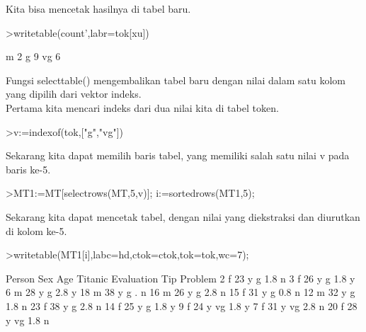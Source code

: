 \documentclass[a4paper,10pt]{article}
\begin{document}
\begin{eulernotebook}
\begin{eulercomment}
\begin{eulercomment}
\begin{eulercomment}
\begin{eulercomment}
\begin{eulercomment}
\begin{eulercomment}
\begin{eulercomment}
\begin{eulercomment}
\begin{eulercomment}
\begin{eulercomment}
\begin{eulercomment}
\begin{eulercomment}
\begin{eulercomment}
\begin{eulercomment}
\begin{eulercomment}
\begin{eulercomment}
\begin{eulercomment}
Kita bisa mencetak hasilnya di tabel baru.
\end{eulercomment}
\begin{eulerprompt}
>writetable(count',labr=tok[xu])
\end{eulerprompt}
\begin{euleroutput}
           m         2
           g         9
          vg         6
\end{euleroutput}
\begin{eulercomment}
Fungsi selecttable() mengembalikan tabel baru dengan nilai dalam satu
kolom yang dipilih dari vektor indeks.\\
Pertama kita mencari indeks dari dua nilai kita di tabel token.
\end{eulercomment}
\begin{eulerprompt}
>v:=indexof(tok,["g","vg"])
\end{eulerprompt}
\begin{euleroutput}
  [5,  6]
\end{euleroutput}
\begin{eulercomment}
Sekarang kita dapat memilih baris tabel, yang memiliki salah satu
nilai v pada baris ke-5.
\end{eulercomment}
\begin{eulerprompt}
>MT1:=MT[selectrows(MT,5,v)]; i:=sortedrows(MT1,5);
\end{eulerprompt}
\begin{eulercomment}
Sekarang kita dapat mencetak tabel, dengan nilai yang diekstraksi dan
diurutkan di kolom ke-5.
\end{eulercomment}
\begin{eulerprompt}
>writetable(MT1[i],labc=hd,ctok=ctok,tok=tok,wc=7);
\end{eulerprompt}
\begin{euleroutput}
   Person    Sex    Age Titanic Evaluation    Tip Problem
        2      f     23       y          g    1.8       n
        3      f     26       y          g    1.8       y
        6      m     28       y          g    2.8       y
       18      m     38       y          g      .       n
       16      m     26       y          g    2.8       n
       15      f     31       y          g    0.8       n
       12      m     32       y          g    1.8       n
       23      f     38       y          g    2.8       n
       14      f     25       y          g    1.8       y
        9      f     24       y         vg    1.8       y
        7      f     31       y         vg    2.8       n
       20      f     28       y         vg    1.8       n

\end{euleroutput}
\end{eulercomment}
\end{eulercomment}
\end{eulercomment}
\end{eulercomment}
\end{eulercomment}
\end{eulercomment}
\end{eulercomment}
\end{eulercomment}
\end{eulercomment}
\end{eulercomment}
\end{eulercomment}
\end{eulercomment}
\end{eulercomment}
\end{eulercomment}
\end{eulercomment}
\end{eulercomment}
\end{eulernotebook}
\end{document}

